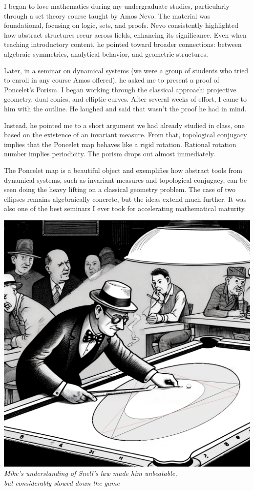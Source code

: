 \begin{commentary}
I began to love mathematics during my undergraduate studies, particularly through a set theory course taught by Amos Nevo. The material was foundational, focusing on logic, sets, and proofs. Nevo consistently highlighted how abstract structures recur across fields, enhancing its significance. Even when teaching introductory content, he pointed toward broader connections: between algebraic symmetries, analytical behavior, and geometric structures.

Later, in a seminar on dynamical systems (we were a group of students who tried to enroll in any course Amos offered), he asked me to present a proof of Poncelet’s Porism. I began working through the classical approach: projective geometry, dual conics, and elliptic curves. After several weeks of effort, I came to him with the outline. He laughed and said that wasn’t the proof he had in mind.

Instead, he pointed me to a short argument we had already studied in class, one based on the existence of an invariant measure. From that, topological conjugacy implies that the Poncelet map behaves like a rigid rotation. Rational rotation number implies periodicity. The porism drops out almost immediately.


The Poncelet map is a beautiful object and exemplifies how abstract tools from dynamical systems, such as invariant measures and topological conjugacy, can be seen doing the heavy lifting on a classical geometry problem. The case of two ellipses remains algebraically concrete, but the ideas extend much further. It was also one of the best seminars I ever took for accelerating mathematical maturity.
\end{commentary}

\vspace{2em}
\begin{center}
    \includegraphics[height=10\baselineskip]{07_BilliardsConicsPorism/BILLIARDS.png}\\
    {\small\textit{Mike's understanding of Snell's law made him unbeatable,\\ but considerably slowed down the game}}
\end{center}